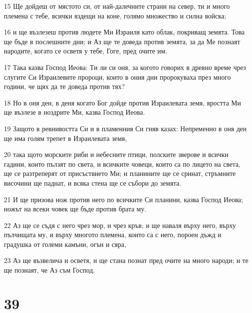 \par 15 Ще дойдеш от мястото си, от най-далечните страни на север, ти и много племена с тебе, всички яздещи на коне, голямо множество и силна войска;
\par 16 и ще възлезеш против людете Ми Израиля като облак, покриващ земята. Това ще бъде в послешните дни; и Аз ще те доведа против земята, за да Ме познаят народите, когато се осветя у тебе, Гоге, пред очите им.
\par 17 Така казва Господ Иеова: Ти ли си оня, за когото говорих в древно време чрез слугите Си Израилевите пророци, които в ония дни пророкуваха през много години, че щях да те доведа против тях?
\par 18 Но в оня ден, в деня когато Бог дойде против Израилевата земя, яростта Ми ще възлезе в ноздрите Ми, казва Господ Иеова.
\par 19 Защото в ревнивостта Си и в пламенния Си гняв казах: Непременно в оня ден ще има голям трепет в Израилевата земя,
\par 20 така щото морските риби и небесните птици, полските зверове и всички гадини, които пълзят по света, и всичките човеци, които са по лицето на света, ще се разтреперят от присъствието Ми; и планините ще се сринат, стръмните височини ще паднат, и всяка стена ще се събори до земята.
\par 21 И ще призова нож против него по всичките Си планини, казва Господ Иеова; ножът на всеки човек ще бъде против брата му.
\par 22 Аз ще се съдя с него чрез мор, и чрез кръв; и ще наваля върху него, върху пълчищата му, и върху многото племена, които са с него, пороен дъжд и градушка от големи камъни, огън и сяра,
\par 23 Аз ще възвелича и осветя, и ще стана познат пред очите на много народи; и те ще познаят, че Аз съм Господ.

\chapter{39}

